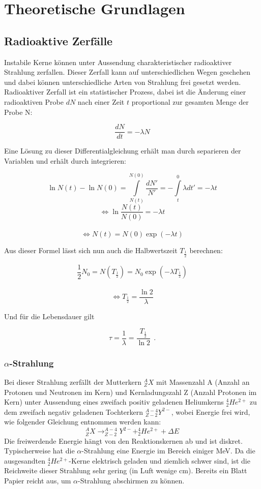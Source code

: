 \clearpage
\section{Theoretische Grundlagen}
\subsection{Radioaktive Zerfälle}
Instabile Kerne können unter Aussendung charakteristischer radioaktiver Strahlung zerfallen. Dieser Zerfall kann auf unterschiedlichen Wegen geschehen und dabei können unterschiedliche Arten von Strahlung frei gesetzt werden. Radioaktiver Zerfall ist ein statistischer Prozess, dabei ist die Änderung einer radioaktiven Probe $dN$ nach einer Zeit $t$ proportional zur gesamten Menge der Probe N:
\begin{center}
\[\frac{dN}{dt}=-\lambda N \]
\end{center}
Eine Lösung zu dieser Differentialgleichung erhält man durch separieren der Variablen und erhält durch integrieren:
\begin{center}
\[\ln N(t)-\ln N(0)= \int\limits_{N(t)}^{N(0)}\frac{dN'}{N'}=- \int\limits_{t}^{0}\lambda dt'= -\lambda t \]
\[ \Leftrightarrow \ln{\frac{N(t)}{N(0)}} = -\lambda t\]\\
\[ \Leftrightarrow N(t)= N(0) \exp(-\lambda t)\]
\end{center}
Aus dieser Formel lässt sich nun auch die Halbwertszeit $T_{\frac{1}{2}}$ berechnen:
\begin{center}
\[ \frac{1}{2}N_0 = N(T_{\frac{1}{2}}) = N_0 \exp(-\lambda T_{\frac{1}{2}})\]\\
\[ \Leftrightarrow T_{\frac{1}{2}} = \frac{\ln 2}{\lambda}\]
\end{center}
Und für die Lebensdauer gilt
\begin{center}
\[ \tau = \frac{1}{\lambda}= \frac{T_{\frac{1}{2}}}{\ln 2}~~. \]
\end{center}

\subsubsection{$\alpha$-Strahlung}
Bei dieser Strahlung zerfällt der Mutterkern $^{A}_{Z}X$ mit Massenzahl A (Anzahl an Protonen und Neutronen im Kern) und Kernladungszahl Z (Anzahl Protonen im Kern) unter Aussendung eines zweifach positiv geladenen Heliumkerns $^{4}_{2}He^{2+}$ zu dem zweifach negativ geladenen Tochterkern $^{A-4}_{Z-2}Y^{2-}$, wobei Energie frei wird, wie folgender Gleichung entnommen werden kann: \[^{A}_{Z}X\rightarrow ^{A-4}_{Z-2}Y^{2-}+^{4}_{2}He^{2+}+\Delta E\]
Die freiwerdende Energie hängt von den Reaktionskernen ab und ist diskret. Typischerweise hat die $\alpha$-Strahlung eine Energie im Bereich einiger MeV. Da die ausgesandten $^{4}_{2}He^{2+}$-Kerne elektrisch geladen und ziemlich schwer sind, ist die Reichweite dieser Strahlung sehr gering (in Luft wenige cm). Bereits ein Blatt Papier reicht aus, um $\alpha$-Strahlung abschirmen zu können.
